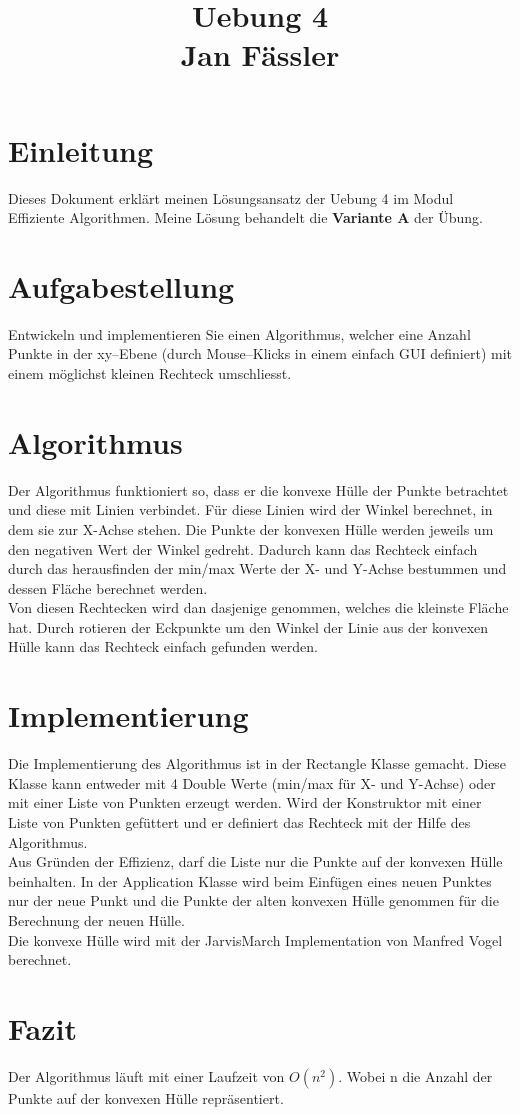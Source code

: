\documentclass[10pt]{scrartcl}
\title{ %
Uebung 4 \\
\vspace{0.2cm} 
\Large Jan Fässler }
\begin{document}
 \maketitle
 \pagestyle{documentstyle}
\section{Einleitung}
Dieses Dokument erklärt meinen Lösungsansatz der Uebung 4 im Modul Effiziente Algorithmen. Meine Lösung behandelt die  \textbf{Variante A} der Übung.
\section{Aufgabestellung}
Entwickeln und implementieren Sie einen Algorithmus, welcher eine Anzahl Punkte in der xy–Ebene (durch Mouse–Klicks in einem einfach GUI definiert) mit einem möglichst kleinen Rechteck umschliesst.
\section{Algorithmus}
Der Algorithmus funktioniert so, dass er die konvexe Hülle der Punkte betrachtet und diese mit Linien verbindet. Für diese Linien wird der Winkel berechnet, in dem sie zur X-Achse stehen. Die Punkte der konvexen Hülle werden jeweils um den negativen Wert der Winkel gedreht. Dadurch kann das Rechteck einfach durch das herausfinden der min/max Werte der X- und Y-Achse bestummen und dessen Fläche berechnet werden. \\
Von diesen Rechtecken wird dan dasjenige genommen, welches die kleinste Fläche hat. Durch rotieren der Eckpunkte um den Winkel der Linie aus der konvexen Hülle kann das Rechteck einfach gefunden werden.
\section{Implementierung}
Die Implementierung des Algorithmus ist in der Rectangle Klasse gemacht. Diese Klasse kann entweder mit 4 Double Werte (min/max für X- und Y-Achse) oder mit einer Liste von Punkten erzeugt werden. Wird der Konstruktor mit einer Liste von Punkten gefüttert und er definiert das Rechteck mit der Hilfe des Algorithmus. \\
Aus Gründen der Effizienz, darf die Liste nur die Punkte auf der konvexen Hülle beinhalten. In der Application Klasse wird beim Einfügen eines neuen Punktes nur der neue Punkt und die Punkte der alten konvexen Hülle genommen für die Berechnung der neuen Hülle. \\
Die konvexe Hülle wird mit der JarvisMarch Implementation von Manfred Vogel berechnet.
\section{Fazit}
Der Algorithmus läuft mit einer Laufzeit von $O(n^2)$. Wobei n die Anzahl der Punkte auf der konvexen Hülle repräsentiert.


 
\end{document}
